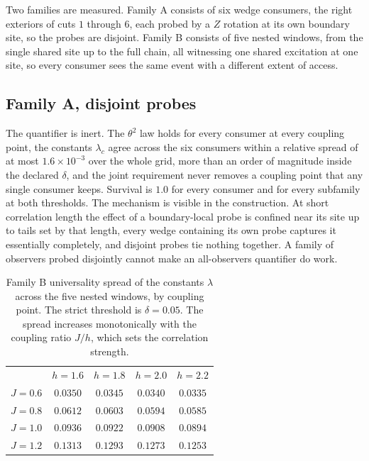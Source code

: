 \documentclass[aps,prd,reprint,nofootinbib,longbibliography]{revtex4-2}
\begin{document}
Two families are measured.  Family A consists of six wedge consumers, the
right exteriors of cuts $1$ through $6$, each probed by a $Z$ rotation at
its own boundary site, so the probes are disjoint.  Family B consists of
five nested windows, from the single shared site up to the full chain, all
witnessing one shared excitation at one site, so every consumer sees the
same event with a different extent of access.

\subsection{Family A, disjoint probes}

The quantifier is inert.  The $\theta^{2}$ law holds for every consumer at
every coupling point, the constants $\lambda_c$ agree across the six
consumers within a relative spread of at most $1.6\times 10^{-3}$ over the
whole grid, more than an order of magnitude inside the declared $\delta$,
and the joint requirement never removes a coupling point that any single
consumer keeps.  Survival is $1.0$ for
every consumer and for every subfamily at both thresholds.  The mechanism
is visible in the construction.  At short correlation length the effect of
a boundary-local probe is confined near its site up to tails set by that
length, every wedge containing its own probe captures it essentially
completely, and disjoint probes tie nothing together.  A
family of observers probed disjointly cannot make an all-observers
quantifier do work.

\begin{table}[t]
\caption{Family B universality spread of the constants $\lambda$ across
the five nested windows, by coupling point.  The strict threshold is
$\delta=0.05$.  The spread increases monotonically with the coupling
ratio $J/h$, which sets the correlation strength.}
\label{tab:spread}
\begin{ruledtabular}
\begin{tabular}{ccccc}
 & $h=1.6$ & $h=1.8$ & $h=2.0$ & $h=2.2$ \\
\colrule
$J=0.6$ & $0.0350$ & $0.0345$ & $0.0340$ & $0.0335$ \\
$J=0.8$ & $0.0612$ & $0.0603$ & $0.0594$ & $0.0585$ \\
$J=1.0$ & $0.0936$ & $0.0922$ & $0.0908$ & $0.0894$ \\
$J=1.2$ & $0.1313$ & $0.1293$ & $0.1273$ & $0.1253$ \\
\end{tabular}
\end{ruledtabular}
\end{table}
\end{document}

